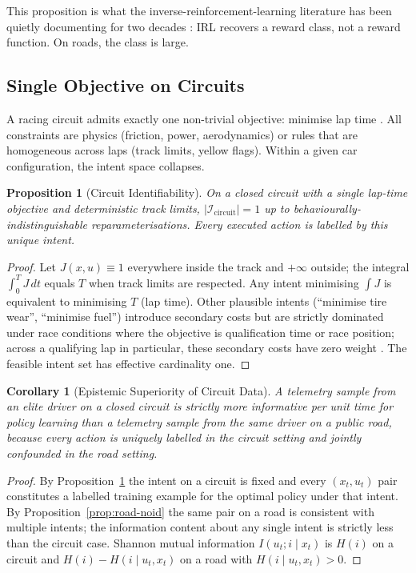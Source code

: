 \documentclass[11pt,twocolumn]{article}
\newtheorem{proposition}[theorem]{Proposition}
\newtheorem{corollary}[theorem]{Corollary}
\theoremstyle{definition}
\theoremstyle{remark}
\providecommand{\cI}{\mathcal{I}}
\begin{document}
This proposition is what the inverse-reinforcement-learning literature has been quietly documenting for two decades \cite{ng2000algorithms,ziebart2008maximum}: IRL recovers a reward class, not a reward function. On roads, the class is large.

\subsection{Single Objective on Circuits}

A racing circuit admits exactly one non-trivial objective: minimise lap time \cite{milliken1995race,fia2023sporting}. All constraints are physics (friction, power, aerodynamics) or rules that are homogeneous across laps (track limits, yellow flags). Within a given car configuration, the intent space collapses.

\begin{proposition}[Circuit Identifiability]\label{prop:circuit-id}
On a closed circuit with a single lap-time objective and deterministic track limits, $|\cI_{\mathrm{circuit}}| = 1$ up to behaviourally-indistinguishable reparameterisations. Every executed action is labelled by this unique intent.
\end{proposition}

\begin{proof}
Let $J(x,u) \equiv 1$ everywhere inside the track and $+\infty$ outside; the integral $\int_0^T J\,dt$ equals $T$ when track limits are respected. Any intent minimising $\int J$ is equivalent to minimising $T$ (lap time). Other plausible intents (``minimise tire wear'', ``minimise fuel'') introduce secondary costs but are strictly dominated under race conditions where the objective is qualification time or race position; across a qualifying lap in particular, these secondary costs have zero weight \cite{fia2023sporting,pirelli2023specs}. The feasible intent set has effective cardinality one.
\end{proof}

\begin{corollary}[Epistemic Superiority of Circuit Data]\label{cor:epistemic}
A telemetry sample from an elite driver on a closed circuit is strictly more informative per unit time for policy learning than a telemetry sample from the same driver on a public road, because every action is uniquely labelled in the circuit setting and jointly confounded in the road setting.
\end{corollary}

\begin{proof}
By Proposition~\ref{prop:circuit-id} the intent on a circuit is fixed and every $(x_t, u_t)$ pair constitutes a labelled training example for the optimal policy under that intent. By Proposition~\ref{prop:road-noid} the same pair on a road is consistent with multiple intents; the information content about any single intent is strictly less than the circuit case. Shannon mutual information $I(u_t; i \mid x_t)$ is $H(i)$ on a circuit and $H(i) - H(i \mid u_t, x_t)$ on a road with $H(i \mid u_t, x_t) > 0$.
\end{proof}
\end{document}
